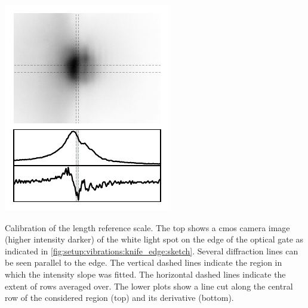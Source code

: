 \begin{marginfigure}
    \centering
    \includegraphics{img/pdf/setup/knife_edge}
    \caption[]{
        Calibration of the length reference scale.
        The top shows a \acrshort{cmos} camera image (higher intensity darker) of the white light spot on the edge of the optical gate as indicated in \cref{fig:setup:vibrations:knife_edge:sketch}.
        Several diffraction lines can be seen parallel to the edge.
        The vertical dashed lines indicate the region in which the intensity slope was fitted.
        The horizontal dashed lines indicate the extent of rows averaged over.
        The lower plots show a line cut along the central row of the considered region (top) and its derivative (bottom).
    }
    \label{fig:setup:vibrations:calibration:length_scale}
\end{marginfigure}

